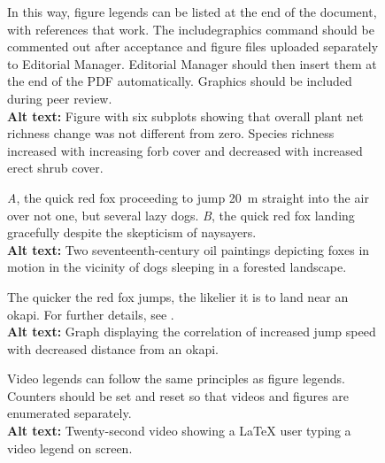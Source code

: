 ﻿\documentclass[11pt]{article}
\begin{document}
\begin{figure}[h!]
\caption{In this way, figure legends can be listed at the end of the document, with references that work. The includegraphics command should be commented out after acceptance and figure files uploaded separately to Editorial Manager. Editorial Manager should then insert them at the end of the PDF automatically. Graphics should be included during peer review. \\
\textbf{Alt text:} Figure with six subplots showing that overall plant net richness change was not different from zero. Species richness increased with increasing forb cover and decreased with increased erect shrub cover.}
\label{Fig:AnotherFigure}
\end{figure}


\renewcommand{\thefigure}{A\arabic{figure}}
\setcounter{figure}{0}

\begin{figure}[h!]
\caption{\textit{A}, the quick red fox proceeding to jump 20~m straight into the air over not one, but several lazy dogs. \textit{B}, the quick red fox landing gracefully despite the skepticism of naysayers. \\
\textbf{Alt text:} Two seventeenth-century oil paintings depicting foxes in motion in the vicinity of dogs sleeping in a forested landscape.}
\label{Fig:Jumps}
\end{figure}

\begin{figure}[h!]
\caption{The quicker the red fox jumps, the likelier it is to land near an okapi. For further details, see \citet{LemKapEx07}. \\
\textbf{Alt text:} Graph displaying the correlation of increased jump speed with decreased distance from an okapi.}
\label{Fig:JumpsOk}
\end{figure}




\renewcommand{\figurename}{Video} 
\renewcommand{\thefigure}{S\arabic{figure}}
\setcounter{figure}{0}

\begin{figure}[h!]
\caption{Video legends can follow the same principles as figure legends. Counters should be set and reset so that videos and figures are enumerated separately.\\
\textbf{Alt text:} Twenty-second video showing a \LaTeX{} user typing a video legend on screen.}
\label{VideoExample}
\end{figure}

\renewcommand{\figurename}{Figure}
\setcounter{figure}{1}

\end{document}
